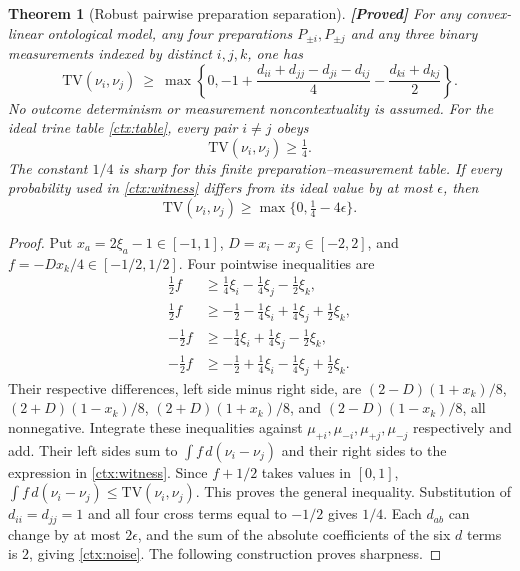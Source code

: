 \documentclass[11pt,a4paper]{article}
\newtheorem{theorem}{Theorem}[section]
\theoremstyle{definition}
\theoremstyle{remark}\newtheorem{remark}[theorem]{Remark}
\newcommand{\status}[1]{\textbf{[#1]}\quad}
\newcommand{\TV}{\mathrm{TV}}
\begin{document}
\begin{theorem}[Robust pairwise preparation separation]\label{ctx:robust}
\status{Proved}
For any convex-linear ontological model, any four preparations
$P_{\pm i},P_{\pm j}$ and any three binary measurements indexed by distinct
$i,j,k$, one has
\begin{equation}\label{ctx:witness}
 \TV(\nu_i,\nu_j)\ \ge\
 \max\left\{0,-1+
 \frac{d_{ii}+d_{jj}-d_{ji}-d_{ij}}4
 -\frac{d_{ki}+d_{kj}}2\right\}.
\end{equation}
No outcome determinism or measurement noncontextuality is assumed.
For the ideal trine table \eqref{ctx:table}, every pair $i\ne j$ obeys
\begin{equation}\label{ctx:quarterpair}
 \TV(\nu_i,\nu_j)\ge\tfrac14.
\end{equation}
The constant $1/4$ is sharp for this finite preparation--measurement table.
If every probability used in \eqref{ctx:witness} differs from its ideal
value by at most $\epsilon$, then
\begin{equation}\label{ctx:noise}
 \TV(\nu_i,\nu_j)\ge\max\{0,\tfrac14-4\epsilon\}.
\end{equation}
\end{theorem}

\begin{proof}
Put $x_a=2\xi_a-1\in[-1,1]$, $D=x_i-x_j\in[-2,2]$, and
$f=-Dx_k/4\in[-1/2,1/2]$. Four pointwise inequalities are
\begin{align*}
 \tfrac12 f&\ge\tfrac14\xi_i-\tfrac14\xi_j-\tfrac12\xi_k,\\
 \tfrac12 f&\ge-\tfrac12-\tfrac14\xi_i+\tfrac14\xi_j+\tfrac12\xi_k,\\
 -\tfrac12 f&\ge-\tfrac14\xi_i+\tfrac14\xi_j-\tfrac12\xi_k,\\
 -\tfrac12 f&\ge-\tfrac12+\tfrac14\xi_i-\tfrac14\xi_j+\tfrac12\xi_k.
\end{align*}
Their respective differences, left side minus right side, are
$(2-D)(1+x_k)/8$, $(2+D)(1-x_k)/8$,
$(2+D)(1+x_k)/8$, and $(2-D)(1-x_k)/8$, all nonnegative.
Integrate these inequalities against $\mu_{+i},\mu_{-i},\mu_{+j},
\mu_{-j}$ respectively and add. Their left sides sum to
$\int f\,d(\nu_i-\nu_j)$ and their right sides to the expression in
\eqref{ctx:witness}. Since $f+1/2$ takes values in $[0,1]$,
$\int f\,d(\nu_i-\nu_j)\le\TV(\nu_i,\nu_j)$.
This proves the general inequality. Substitution of
$d_{ii}=d_{jj}=1$ and all four cross terms equal to $-1/2$ gives
$1/4$. Each $d_{ab}$ can change by at most $2\epsilon$, and the sum
of the absolute coefficients of the six $d$ terms is $2$, giving
\eqref{ctx:noise}. The following construction proves sharpness.
\end{proof}
\end{document}
